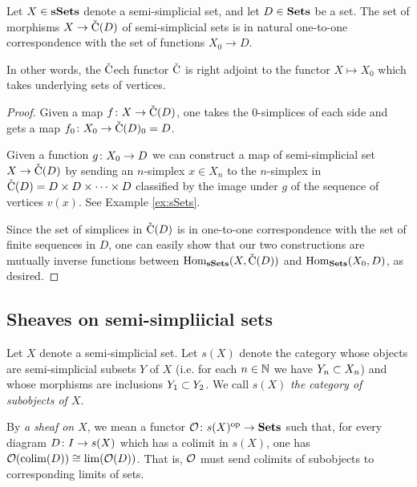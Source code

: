 \documentclass{amsart}
\def\Cech{$\check{\tn{C}}$ech }
\def\C{\check{\tn{C}}}
\begin{document}
\begin{proposition}

Let $X\in\sSets$ denote a semi-simplicial set, and let $D\in\Sets$ be a set.  The set of morphisms $X\to\C(D)$ of semi-simplicial sets is in natural one-to-one correspondence with the set of functions $X_0\to D$.  

In other words, the \Cech functor $\C$ is right adjoint to the functor $X\mapsto X_0$ which takes underlying sets of vertices.

\end{proposition}

\begin{proof}

Given a map $f\taking X\to\C(D)$, one takes the 0-simplices of each side and gets a map $f_0\taking X_0\to\C(D)_0=D$.

Given a function $g\taking X_0\to D$ we can construct a map of semi-simplicial set $X\to\C(D)$ by sending an $n$-simplex $x\in X_n$ to the $n$-simplex in $\C(D)=D\cross D\cross\cdots\cross D$ classified by the image under $g$ of the sequence of vertices $v(x)$.  See Example \ref{ex:sSets}.

Since the set of simplices in $\C(D)$ is in one-to-one correspondence with the set of finite sequences in $D$, one can easily show that our two constructions are mutually inverse functions between $\Hom_\sSets(X,\C(D))$ and $\Hom_\Sets(X_0,D)$, as desired.

\end{proof}

\subsection{Sheaves on semi-simpliicial sets}

\begin{definition}

Let $X$ denote a semi-simplicial set.  Let $s(X)$ denote the category whose objects are semi-simplicial subsets $Y$ of $X$ (i.e. for each $n\in\NN$ we have $Y_n\ss X_n$) and whose morphisms are inclusions $Y_1\ss Y_2$.  We call $s(X)$ {\em the category of subobjects of $X$}.

By {\em a sheaf on $X$}, we mean a functor $\mcO\taking s(X)\op\to\Sets$ such that, for every diagram $D\taking I\to s(X)$ which has a colimit in $s(X)$, one has $\mcO(\colim(D))\iso\lim(\mcO(D))$.  That is, $\mcO$ must send colimits of subobjects to corresponding limits of sets.

\end{definition}
\end{document}
